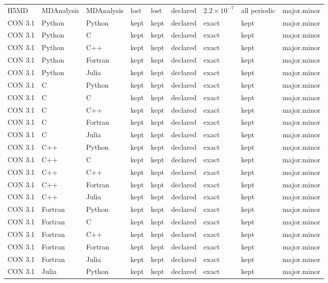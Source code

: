 \begin{table}[ht]
{\begin{tabular}{@{}lllllllll@{}}
H5MD & MDAnalysis & MDAnalysis & lost & lost & declared & \(2.2\times10^{-7}\) & all periodic & major.minor \\
CON 3.1 & Python & Python & kept & kept & declared & exact & kept & major.minor \\
CON 3.1 & Python & C & kept & kept & declared & exact & kept & major.minor \\
CON 3.1 & Python & C++ & kept & kept & declared & exact & kept & major.minor \\
CON 3.1 & Python & Fortran & kept & kept & declared & exact & kept & major.minor \\
CON 3.1 & Python & Julia & kept & kept & declared & exact & kept & major.minor \\
CON 3.1 & C & Python & kept & kept & declared & exact & kept & major.minor \\
CON 3.1 & C & C & kept & kept & declared & exact & kept & major.minor \\
CON 3.1 & C & C++ & kept & kept & declared & exact & kept & major.minor \\
CON 3.1 & C & Fortran & kept & kept & declared & exact & kept & major.minor \\
CON 3.1 & C & Julia & kept & kept & declared & exact & kept & major.minor \\
CON 3.1 & C++ & Python & kept & kept & declared & exact & kept & major.minor \\
CON 3.1 & C++ & C & kept & kept & declared & exact & kept & major.minor \\
CON 3.1 & C++ & C++ & kept & kept & declared & exact & kept & major.minor \\
CON 3.1 & C++ & Fortran & kept & kept & declared & exact & kept & major.minor \\
CON 3.1 & C++ & Julia & kept & kept & declared & exact & kept & major.minor \\
CON 3.1 & Fortran & Python & kept & kept & declared & exact & kept & major.minor \\
CON 3.1 & Fortran & C & kept & kept & declared & exact & kept & major.minor \\
CON 3.1 & Fortran & C++ & kept & kept & declared & exact & kept & major.minor \\
CON 3.1 & Fortran & Fortran & kept & kept & declared & exact & kept & major.minor \\
CON 3.1 & Fortran & Julia & kept & kept & declared & exact & kept & major.minor \\
CON 3.1 & Julia & Python & kept & kept & declared & exact & kept & major.minor \\

\end{tabular}}
\end{table}
